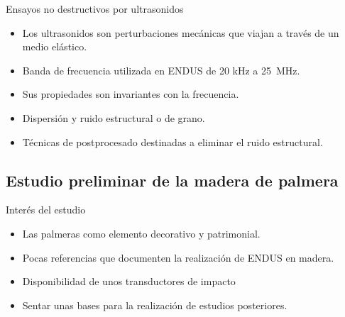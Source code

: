 \documentclass[utf8, compress]			{beamer}
\begin{document}
\begin{frame}{Ensayos no destructivos por ultrasonidos}
    \begin{itemize}
	\item Los ultrasonidos son perturbaciones mecánicas que viajan a través
	    de un medio elástico.
	\item Banda de frecuencia utilizada en ENDUS de 20 kHz a 25~MHz.
	\item Sus propiedades son invariantes con la frecuencia.
	\item Dispersión y ruido estructural o de grano.
	\item Técnicas de postprocesado destinadas a eliminar el ruido
	    estructural.
    \end{itemize}
\end{frame}


\subsection{Estudio preliminar de la madera de palmera}

\begin{frame}{Interés del estudio}
    \begin{itemize}
	\item Las palmeras como elemento decorativo y patrimonial.
	\item Pocas referencias que documenten la realización de ENDUS en
	    madera.
	\item Disponibilidad de unos transductores de impacto
	\item \alert{Sentar unas bases para la realización de estudios
	    posteriores.}
    \end{itemize}
\end{frame}
\end{document}
